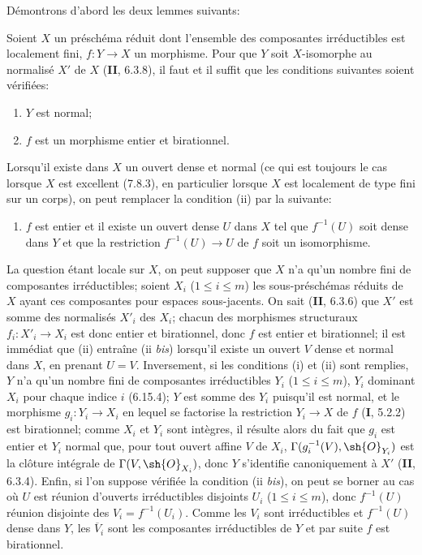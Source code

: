 Démontrons d'abord les deux lemmes suivants:

\begin{lemma}[17.15.14.1]
\label{IV.17.15.14.1}
Soient $X$ un préschéma réduit dont l'ensemble des composantes irréductibles est localement fini, $f:Y\to X$ un morphisme. Pour que $Y$ soit $X$-isomorphe au normalisé $X'$ de $X$ \textup{(\textbf{II}, 6.3.8)}, il faut et il suffit que les conditions suivantes soient vérifiées:
\begin{enumerate}
  \item[\textup{(i)}] $Y$ est normal;
  \item[\textup{(ii)}] $f$ est un morphisme entier et birationnel.
\end{enumerate}

Lorsqu'il existe dans $X$ un ouvert dense et normal (ce qui est toujours le cas lorsque $X$ est excellent \textup{(7.8.3)}, en particulier lorsque $X$ est localement de type fini sur un corps), on peut remplacer la condition \textup{(ii)} par la suivante:
\begin{enumerate}
  \item[\textup{(ii \emph{bis})}] $f$ est entier et il existe un ouvert dense $U$ dans $X$ tel que $f^{-1}(U)$ soit dense dans $Y$ et que la restriction $f^{-1}(U)\to U$ de $f$ soit un isomorphisme.
\end{enumerate}
\end{lemma}

La question étant locale sur $X$, on peut supposer que $X$ n'a qu'un nombre fini de composantes irréductibles; soient $X_i$ ($1\leq i\leq m$) les sous-préschémas réduits de $X$ ayant ces composantes pour espaces sous-jacents. On sait (\textbf{II}, 6.3.6) que $X'$ est somme des normalisés $X'_i$ des $X_i$; chacun des morphismes structuraux $f_i:X'_i\to X_i$ est donc entier et birationnel, donc $f$ est entier et birationnel; il est immédiat que (ii) entraîne (ii \emph{bis}) lorsqu'il existe un ouvert $V$ dense et normal dans $X$, en prenant $U=V$. Inversement, si les conditions (i) et (ii) sont remplies, $Y$ n'a qu'un nombre fini de composantes irréductibles $Y_i$ ($1\leq i\leq m$), $Y_i$ dominant $X_i$ pour chaque indice $i$ (6.15.4); $Y$ est somme des $Y_i$ puisqu'il est normal, et le morphisme $g_i:Y_i\to X_i$ en lequel se factorise la restriction $Y_i\to X$ de $f$ (\textbf{I}, 5.2.2) est birationnel; comme $X_i$ et $Y_i$ sont intègres, il résulte alors du fait que $g_i$ est entier et $Y_i$ normal que, pour tout ouvert affine $V$ de $X_i$, $\Gamma(g_i^{-1}(V),\sh{O}_{Y_i})$ est la clôture intégrale de $\Gamma(V,\sh{O}_{X_i})$, donc $Y$ s'identifie canoniquement à $X'$ (\textbf{II}, 6.3.4). Enfin, si l'on suppose vérifiée la condition (ii \emph{bis}), on peut se borner au cas où $U$ est réunion d'ouverts irréductibles disjoints $U_i$ ($1\leq i\leq m$), donc $f^{-1}(U)$ réunion disjointe des $V_i=f^{-1}(U_i)$. Comme les $V_i$ sont irréductibles et $f^{-1}(U)$ dense dans $Y$, les $\overline{V}_i$ sont les composantes irréductibles de $Y$ et par suite $f$ est birationnel.

